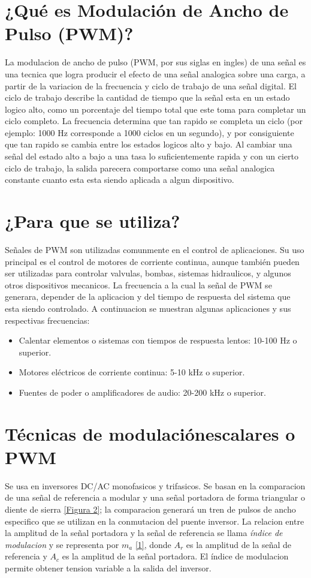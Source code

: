 \documentclass[10pt,a4paper]{article}
\begin{document}
\section{¿Qué es Modulación de Ancho de Pulso (PWM)?}
La modulacion de ancho de pulso (PWM, por sus siglas en ingles) de una señal es una tecnica que logra producir el efecto de una señal analogica sobre una carga, a partir de la variacion de la frecuencia y ciclo de trabajo de una señal digital. El ciclo de trabajo describe la cantidad de tiempo que la señal esta en un estado logico alto, como un porcentaje del tiempo total que este toma para completar un ciclo completo. La frecuencia determina que tan rapido se completa un ciclo (por ejemplo: 1000 Hz corresponde a 1000 ciclos en un segundo), y por consiguiente que tan rapido se cambia entre los estados logicos alto y bajo. Al cambiar una señal del estado alto a bajo a una tasa lo suficientemente rapida y con un cierto ciclo de trabajo, la salida parecera comportarse como una señal analogica constante cuanto esta esta siendo aplicada a algun dispositivo.

\section{¿Para que se utiliza?}
Señales de PWM son utilizadas comunmente en el control de aplicaciones. Su uso principal es el control de motores de corriente continua, aunque tambi\'en pueden ser utilizadas para controlar valvulas, bombas, sistemas hidraulicos, y algunos otros dispositivos mecanicos. La frecuencia a la cual la señal de PWM se generara, depender de la aplicacion y del tiempo de respuesta del sistema que esta siendo controlado. A continuacion se muestran algunas aplicaciones y sus respectivas frecuencias:
\begin{itemize}
\item Calentar elementos o sistemas con tiempos de respuesta lentos: 10-100 Hz o superior.            
\item Motores eléctricos de corriente continua: 5-10 kHz o superior.
\item Fuentes de poder o amplificadores de audio: 20-200 kHz o superior.
\end{itemize}
\section{T\'ecnicas de modulaci\'onescalares o PWM}

Se  usa  en  inversores  DC/AC monofasicos y trifasicos. Se basan en la comparacion de una se\~nal de referencia  a  modular  y  una  señal portadora  de  forma  triangular  o diente de sierra \ref{Figura 2}; la comparacion generar\'a un tren de pulsos de ancho especifico que se utilizan en la conmutacion del puente inversor. La relacion entre la amplitud de la señal portadora y la se\~nal de referencia se llama \textit{\'indice de modulacion} y  se  representa  por  $m_a$ \ref{1},  donde  $A_r$ es la amplitud de la se\~nal de referencia y $A_c$ es la amplitud de la señal portadora. El \'indice de modulacion  permite  obtener tension variable a la salida del inversor.
\end{document}

